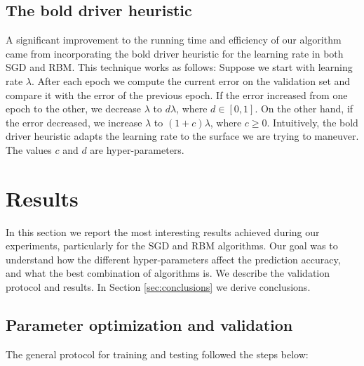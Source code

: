 \documentclass[10pt,conference,compsocconf]{IEEEtran}
\begin{document}
	\subsection{The bold driver heuristic} 
	A significant improvement to the running time and efficiency of our algorithm came from incorporating the bold driver heuristic for the learning rate in both SGD and RBM. This technique works as follows: Suppose we start with learning rate $\lambda$. After each epoch we compute the current error on the validation set and compare it with the error of the previous epoch. If the error increased from one epoch to the other, we decrease $\lambda$ to $d\lambda$, where $d\in[0,1]$. On the other hand, if the error decreased, we increase $\lambda$ to $(1+c)\lambda$, where $c\geq 0$. Intuitively, the bold driver heuristic adapts the learning rate to the surface we are trying to maneuver. The values $c$ and $d$ are hyper-parameters.
	
	\section{Results}
	\label{sec:results}
	In this section we report the most interesting results achieved during our experiments, particularly for the SGD and RBM algorithms. Our goal was to understand how the different hyper-parameters affect the prediction accuracy, and what the best combination of algorithms is. We describe the validation protocol and results. In Section \ref{sec:conclusions} we derive conclusions.
	\subsection{Parameter optimization and validation} 
	The general protocol for training and testing followed the steps below:
	
\end{document}
